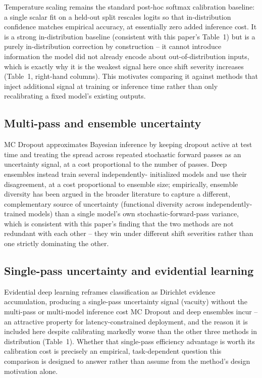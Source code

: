 \documentclass[runningheads]{llncs}
\begin{document}
Temperature scaling \cite{guo2017calibration} remains the standard
post-hoc softmax calibration baseline: a single scalar fit on a held-out
split rescales logits so that in-distribution confidence matches
empirical accuracy, at essentially zero added inference cost. It is a
strong in-distribution baseline (consistent with this paper's Table~1) but
is a purely in-distribution correction by construction -- it cannot
introduce information the model did not already encode about
out-of-distribution inputs, which is exactly why it is the weakest signal
here once shift severity increases (Table~1, right-hand columns). This
motivates comparing it against methods that inject additional
signal at training or inference time rather than only recalibrating a
fixed model's existing outputs.

\subsection{Multi-pass and ensemble uncertainty}

MC Dropout \cite{gal2016dropout} approximates Bayesian inference by
keeping dropout active at test time and treating the spread across
repeated stochastic forward passes as an uncertainty signal, at a cost
proportional to the number of passes. Deep ensembles
\cite{lakshminarayanan2017ensembles} instead train several independently-
initialized models and use their disagreement, at a cost proportional to
ensemble size; empirically, ensemble diversity has been argued in the
broader literature to capture a different, complementary source of
uncertainty (functional diversity across independently-trained models)
than a single model's own stochastic-forward-pass variance, which is
consistent with this paper's finding that the two methods are not
redundant with each other -- they win under different shift severities
rather than one strictly dominating the other.

\subsection{Single-pass uncertainty and evidential learning}

Evidential deep learning \cite{sensoy2018evidential} reframes
classification as Dirichlet evidence accumulation, producing a
single-pass uncertainty signal (vacuity) without the multi-pass or
multi-model inference cost MC Dropout and deep ensembles incur -- an
attractive property for latency-constrained deployment, and the reason it
is included here despite calibrating markedly worse than the other three
methods in distribution (Table~1). Whether that single-pass efficiency
advantage is worth its calibration cost is precisely an empirical,
task-dependent question this comparison is designed to answer rather than
assume from the method's design motivation alone.
\end{document}
